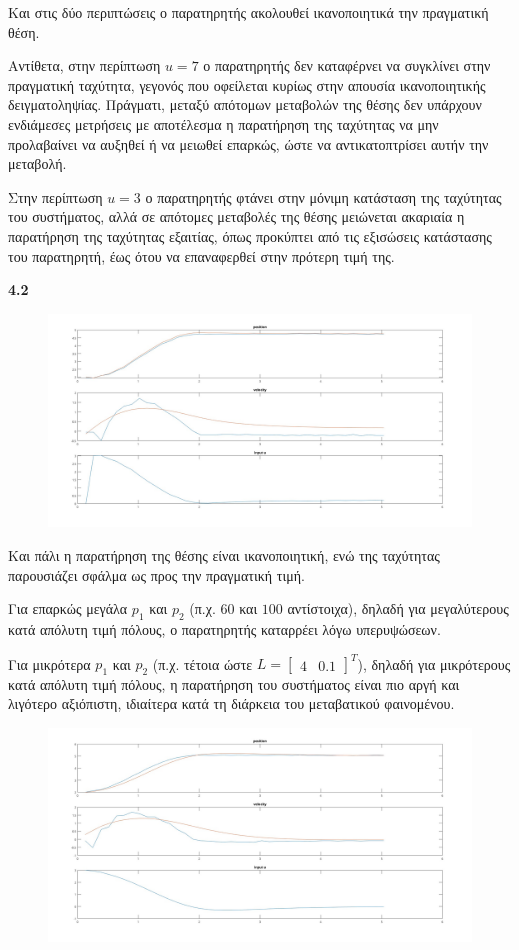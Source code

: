 \documentclass[12pt]{article}
\begin{document}
Και στις δύο περιπτώσεις ο παρατηρητής ακολουθεί ικανοποιητικά την πραγματική θέση. 

Αντίθετα, στην περίπτωση \(u = 7\) ο παρατηρητής δεν καταφέρνει να συγκλίνει στην πραγματική ταχύτητα, γεγονός που οφείλεται κυρίως στην απουσία ικανοποιητικής δειγματοληψίας. Πράγματι, μεταξύ απότομων μεταβολών της θέσης δεν υπάρχουν ενδιάμεσες μετρήσεις με αποτέλεσμα η παρατήρηση της ταχύτητας να μην προλαβαίνει να αυξηθεί ή να μειωθεί επαρκώς, ώστε να αντικατοπτρίσει αυτήν την μεταβολή. 

Στην περίπτωση \(u = 3\) ο παρατηρητής φτάνει στην μόνιμη κατάσταση της ταχύτητας του συστήματος, αλλά σε απότομες μεταβολές της θέσης μειώνεται ακαριαία η παρατήρηση της ταχύτητας εξαιτίας, όπως προκύπτει από τις εξισώσεις κατάστασης του παρατηρητή, έως ότου να επαναφερθεί στην πρότερη τιμή της.

\bigskip
\textbf{4.2}
\begin{figure}[H]
    \centering
    \includegraphics*[scale=0.25]{lab4b_all.jpg}
\end{figure}
Και πάλι η παρατήρηση της θέσης είναι ικανοποιητική, ενώ της ταχύτητας παρουσιάζει σφάλμα ως προς την πραγματική τιμή. 

Για επαρκώς μεγάλα \(p_1 \) και \(p_2\) (π.χ. \(60\) και \(100\) αντίστοιχα), δηλαδή για μεγαλύτερους κατά απόλυτη τιμή πόλους, ο παρατηρητής καταρρέει λόγω υπερυψώσεων. 

Για μικρότερα \(p_1\) και \(p_2\) (π.χ. τέτοια ώστε \(L = \begin{bmatrix}
    4 & 0.1
\end{bmatrix}^T\)), δηλαδή για μικρότερους κατά απόλυτη τιμή πόλους, η παρατήρηση του συστήματος είναι πιο αργή και λιγότερο αξιόπιστη, ιδιαίτερα κατά τη διάρκεια του μεταβατικού φαινομένου. 
\begin{figure}[H]
    \centering
    \includegraphics*[scale=0.25]{lab4b_lowgains_all.jpg}
\end{figure}
\end{document}
